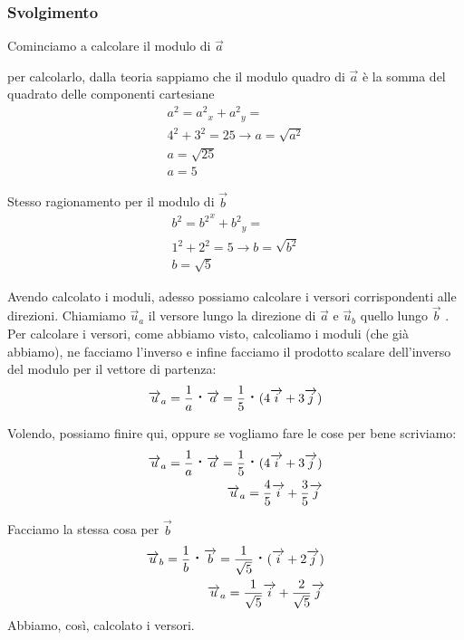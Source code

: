\documentclass[a4paper]{book}
\newcommand{\prodscal}{\text{\large{\textbf{\textperiodcentered}}}} %
\begin{document}
\subsubsection{Svolgimento}
Cominciamo a calcolare il modulo di $\overrightarrow{a}$

per calcolarlo, dalla teoria sappiamo che il modulo quadro di $ \overrightarrow{a} $ è la somma del quadrato delle componenti cartesiane
\begin{align*}
 a^{2} = {a^{2}}_{x} + {a^{2}}_{y} = \\
  4^{2} + 3^{2} = 25 \rightarrow a = \sqrt{a^{2}} \\
  a = \sqrt{25}\\
  a = 5
\end{align*}

Stesso ragionamento per il modulo di $ \overrightarrow{b} $
\begin{align*}
b^{2} = {b^{2}}^{x} + {b^{2}}_{y} = \\
1^{2} + 2^{2} = 5 \rightarrow b = \sqrt{b^{2}} \\
b = \sqrt{5}
\end{align*}

Avendo calcolato i moduli, adesso possiamo calcolare i versori corrispondenti alle direzioni. Chiamiamo $ \overrightarrow{u}_{a} $ il versore lungo la direzione di $ \overrightarrow{a} $ e $ \overrightarrow{u}_{b} $ quello lungo $ \overrightarrow{b} $ .
Per calcolare i versori, come abbiamo visto, calcoliamo i moduli (che già abbiamo), ne facciamo l'inverso e infine facciamo il prodotto scalare dell'inverso del modulo per il vettore di partenza:
\begin{align*}
\overrightarrow{u}_{a} = \frac{1}{a} \prodscal \overrightarrow{a} = \frac{1}{5} \prodscal (4\overrightarrow{i} + 3\overrightarrow{j}) 
\end{align*}

Volendo, possiamo finire qui, oppure se vogliamo fare le cose per bene scriviamo:
\begin{align*}
\overrightarrow{u}_{a} = \frac{1}{a} \prodscal \overrightarrow{a} = \frac{1}{5} \prodscal (4\overrightarrow{i} + 3\overrightarrow{j}) \\
\overrightarrow{u}_{a} = \frac{4}{5} \overrightarrow{i} + \frac{3}{5} \overrightarrow{j}
\end{align*}

Facciamo la stessa cosa per $ \overrightarrow{b} $
\begin{align*}
\overrightarrow{u}_{b} = \frac{1}{b} \prodscal \overrightarrow{b} = \frac{1}{\sqrt{5}} \prodscal (\overrightarrow{i} + 2\overrightarrow{j}) \\
\overrightarrow{u}_{a} = \frac{1}{\sqrt{5}} \overrightarrow{i} + \frac{2}{\sqrt{5}} \overrightarrow{j}
\end{align*}
Abbiamo, così, calcolato i versori.
\end{document}
